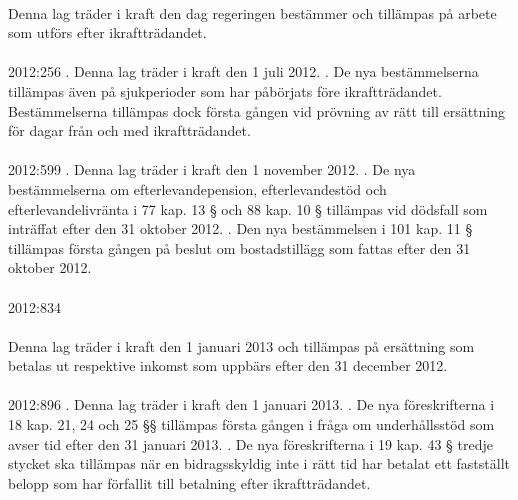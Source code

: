 \documentclass[a4paper,notitlepage,openany,10pt]{book}
\begin{document}
\paragraph*{}
Denna lag träder i kraft den dag regeringen bestämmer och tillämpas på arbete som utförs efter ikraftträdandet.
\paragraph*{}
2012:256
. Denna lag träder i kraft den 1 juli 2012.
. De nya bestämmelserna tillämpas även på sjukperioder som har påbörjats före ikraftträdandet. Bestämmelserna tillämpas dock första gången vid prövning av rätt till ersättning för dagar från och med ikraftträdandet.
\paragraph*{}
2012:599
. Denna lag träder i kraft den 1 november 2012.
. De nya bestämmelserna om efterlevandepension, efterlevandestöd och efterlevandelivränta i 77 kap. 13 § och 88 kap. 10 § tillämpas vid dödsfall som inträffat efter den 31 oktober 2012.
. Den nya bestämmelsen i 101 kap. 11 § tillämpas första gången på beslut om bostadstillägg som fattas efter den 31 oktober 2012.
\paragraph*{}
2012:834
\paragraph*{}
Denna lag träder i kraft den 1 januari 2013 och tillämpas på ersättning som betalas ut respektive inkomst som uppbärs efter den 31 december 2012.
\paragraph*{}
2012:896
. Denna lag träder i kraft den 1 januari 2013.
. De nya föreskrifterna i 18 kap. 21, 24 och 25 §§ tillämpas första gången i fråga om underhållsstöd som avser tid efter den 31 januari 2013.
. De nya föreskrifterna i 19 kap. 43 § tredje stycket ska tillämpas när en bidragsskyldig inte i rätt tid har betalat ett fastställt belopp som har förfallit till betalning efter ikraftträdandet.
\end{document}
